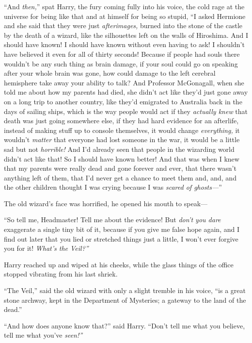 ``And \emph{then,}'' spat Harry, the fury coming fully into his voice,
the cold rage at the universe for being like that and at himself for
being so stupid, ``I asked Hermione and she said that they were just
\emph{afterimages,} burned into the stone of the castle by the death of
a wizard, like the silhouettes left on the walls of Hiroshima. And I
should have known! I should have known without even having to ask! I
shouldn't have believed it even for all of thirty seconds! Because if
people had souls there wouldn't be any such thing as brain damage, if
your soul could go on speaking after your whole brain was gone, how
could damage to the left cerebral hemisphere take away your ability to
talk? And Professor McGonagall, when she told me about how my parents
had died, she didn't act like they'd just gone away on a long trip to
another country, like they'd emigrated to Australia back in the days of
sailing ships, which is the way people would act if they \emph{actually
knew} that death was just going somewhere else, if they had hard
evidence for an afterlife, instead of making stuff up to console
themselves, it would change \emph{everything,} it wouldn't \emph{matter}
that everyone had lost someone in the war, it would be a little sad but
not \emph{horrible!} And I'd already seen that people in the wizarding
world didn't act like that! So I should have known better! And that was
when I knew that my parents were really dead and gone forever and ever,
that there wasn't anything left of them, that I'd never get a chance to
meet them and, and, and the other children thought I was crying because
I was \emph{scared of ghosts---}''

The old wizard's face was horrified, he opened his mouth to speak---

``So tell me, Headmaster! Tell me about the evidence! But \emph{don't
you dare} exaggerate a single tiny bit of it, because if you give me
false hope again, and I find out later that you lied or stretched things
just a little, I won't ever forgive you for it! \emph{What's the
Veil?''}

Harry reached up and wiped at his cheeks, while the glass things of the
office stopped vibrating from his last shriek.

``The Veil,'' said the old wizard with only a slight tremble in his
voice, ``is a great stone archway, kept in the Department of Mysteries;
a gateway to the land of the dead.''

``And how does anyone know that?'' said Harry. ``Don't tell me what you
believe, tell me what you've \emph{seen!''}

